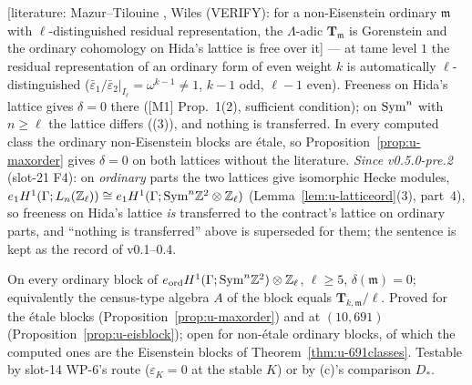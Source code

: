 \documentclass[11pt]{article}
\newcommand{\LIT}[1]{\textsf{[literature: #1]}}   %
\newcommand{\VERIFYloc}{\textsf{VERIFY}}          %
\newcommand{\Iw}{\Lambda}                         %
\newcommand{\Tu}{\mathbf{T}}                      %
\newcommand{\Zl}{\Z_\ell}
\begin{document}
\begin{remark}\label{rmk:u-gorenstein}
\LIT{Mazur--Tilouine \cite{mazur_tilouine}, Wiles \cite[Ch.~2]{wiles_flt} (\VERIFYloc): for a non-Eisenstein ordinary $\mathfrak m$ with $\ell$-distinguished residual
representation, the $\Iw$-adic $\Tu_{\mathfrak m}$ is Gorenstein and the ordinary cohomology on Hida's lattice is free over it} --- at tame level $1$ the residual
representation of an ordinary form of even weight $k$ is automatically $\ell$-distinguished ($\bar\varepsilon_1/\bar\varepsilon_2|_{I_\ell}=\omega^{k-1}\ne1$, $k-1$
odd, $\ell-1$ even). Freeness on Hida's lattice gives $\delta=0$ there ([M1] Prop.~1(2), sufficient condition); on $\mathrm{Sym}^{n}$ with $n\ge\ell$ the lattice differs
((3)), and nothing is transferred. In every computed class the ordinary non-Eisenstein blocks are étale, so Proposition~\ref{prop:u-maxorder}
gives $\delta=0$ on both lattices without the literature. \emph{Since v0.5.0-pre.2} (slot-21 F4): on \emph{ordinary} parts the two lattices give isomorphic Hecke modules,
$e_1H^{1}(\Ga;L_n(\Zl))\cong e_1H^{1}(\Ga;\Sym^{n}\Z^{2}\otimes\Zl)$ (Lemma~\ref{lem:u-latticeord}(3), part~4), so freeness on Hida's lattice \emph{is} transferred to the
contract's lattice on ordinary parts, and ``nothing is transferred'' above is superseded for them; the sentence is kept as the record of v0.1--0.4.
\end{remark}

\begin{prediction}\label{pr:u-U3}
\CONJ{} On every ordinary block of $\eord H^{1}(\Ga;\Sym^{n}\Z^{2})\otimes\Zl$, $\ell\ge5$, $\delta(\mathfrak m)=0$; equivalently the census-type algebra $A$ of the block
equals $\Tu_{k,\mathfrak m}/\ell$. Proved for the étale blocks (Proposition~\ref{prop:u-maxorder}) and \COMP{} at $(10,691)$ (Proposition~\ref{prop:u-eisblock});
open for non-étale ordinary blocks, of which the computed ones are the Eisenstein blocks of Theorem~\ref{thm:u-691classes}. Testable by slot-14 WP-6's route
($\varepsilon_K=0$ at the stable $K$) or by (c)'s comparison $D_\ast$.
\end{prediction}
\end{document}

